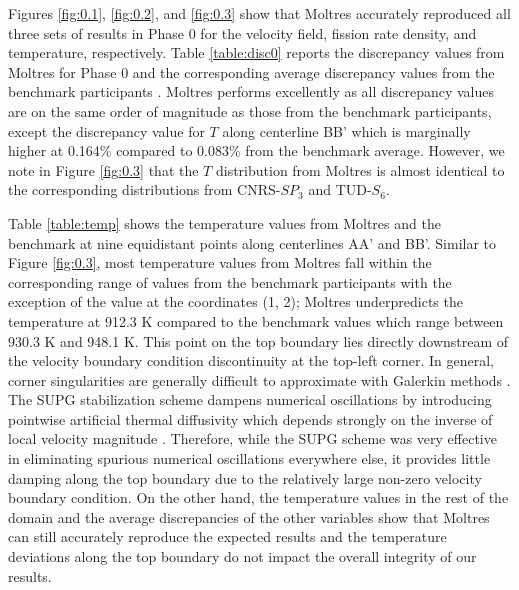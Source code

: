 Figures \ref{fig:0.1}, \ref{fig:0.2}, and \ref{fig:0.3} show that Moltres
accurately reproduced all three sets of results in Phase 0 for the velocity
field, fission rate density, and temperature, respectively. Table
\ref{table:disc0} reports the discrepancy values from Moltres for Phase 0 and
the corresponding average discrepancy values from the benchmark participants
\cite{tiberga_results_2020}. Moltres performs excellently as all discrepancy
values are on the same order of magnitude as those from the benchmark
participants,
except the discrepancy value for $T$ along centerline BB' which is marginally
higher at 0.164\% compared to 0.083\% from the benchmark average. However, we
note in Figure \ref{fig:0.3} that the $T$ distribution from Moltres is almost
identical to the corresponding distributions from CNRS-$SP_3$ and TUD-$S_6$.

Table \ref{table:temp} shows the temperature values from Moltres and the
benchmark at nine equidistant points along centerlines AA' and BB'. Similar to
Figure \ref{fig:0.3}, most temperature values from Moltres fall within the
corresponding range of values from the benchmark participants with the
exception of the
value at the coordinates (1, 2); Moltres underpredicts the temperature at 912.3
K compared to the benchmark values which range between 930.3 K
and 948.1 K. This point on the top boundary lies directly downstream of
the velocity boundary condition discontinuity at the top-left corner.
In general, corner singularities are generally difficult to approximate with
Galerkin methods \citep{kuhlmann_lid-driven_2018}.
The \gls{SUPG} stabilization scheme dampens numerical oscillations by
introducing pointwise artificial thermal diffusivity which depends strongly on
the inverse of local velocity magnitude \citep{peterson_overview_2018}.
Therefore, while the \gls{SUPG} scheme was very effective in eliminating
spurious numerical oscillations everywhere else, it provides little damping
along the top boundary due to the relatively large non-zero velocity boundary
condition. On the other hand, the temperature values in the rest of the domain
and the average discrepancies of the other variables show that Moltres can
still accurately reproduce the expected results and the temperature deviations
along the top boundary do not impact the overall integrity of our results.

